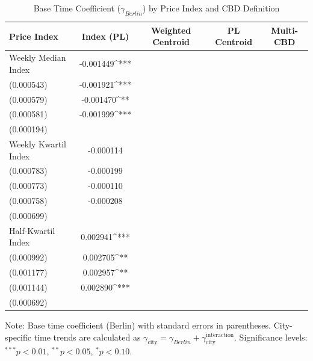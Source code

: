 \documentclass{article}
\begin{document}

\begin{table}[h!]
\centering
\caption{Base Time Coefficient ($\gamma_{Berlin}$) by Price Index and CBD Definition}
\label{tab:gammas_results}
\begin{tabular}{lcccc}
\toprule
Price Index & Index (PL) & Weighted Centroid & PL Centroid & Multi-CBD \\
\midrule
Weekly Median Index & -0.001449^{***}\\ (0.000543) & -0.001921^{***}\\ (0.000579) & -0.001470^{**}\\ (0.000581) & -0.001999^{***}\\ (0.000194) \\
Weekly Kwartil Index & -0.000114\\ (0.000783) & -0.000199\\ (0.000773) & -0.000110\\ (0.000758) & -0.000208\\ (0.000699) \\
Half-Kwartil Index & 0.002941^{***}\\ (0.000992) & 0.002705^{**}\\ (0.001177) & 0.002957^{**}\\ (0.001144) & 0.002890^{***}\\ (0.000692) \\
\bottomrule
\end{tabular}
\begin{tablenotes}[para]
\small
Note: Base time coefficient (Berlin) with standard errors in parentheses.
City-specific time trends are calculated as $\gamma_{\text{city}} = \gamma_{Berlin} + \gamma_{\text{city}}^{\text{interaction}}$.
Significance levels: $^{***} p<0.01$, $^{**} p<0.05$, $^{*} p<0.10$.
\end{tablenotes}
\end{table}

\end{document}

